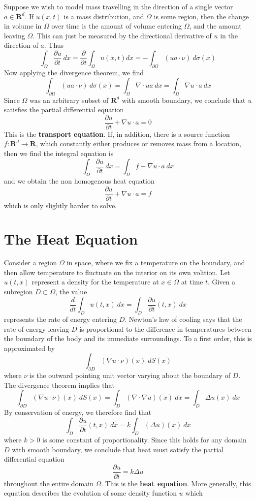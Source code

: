 Suppose we wish to model mass travelling in the direction of a single vector $a \in \mathbf{R}^d$. If $u(x,t)$ is a mass distribution, and $\Omega$ is some region, then the change in volume in $\Omega$ over time is the amount of volume entering $\Omega$, and the amount leaving $\Omega$. This can just be measured by the directional derivative of $u$ in the direction of $a$. Thus
%
\[ \int_\Omega \frac{\partial u}{\partial t}\ dx = \frac{\partial}{\partial t} \int_\Omega u(x,t) dx = - \int_{\partial \Omega} (ua \cdot \nu)\ d\sigma(x) \]
%
Now applying the divergence theorem, we find
%
\[ \int_{\partial \Omega} (ua \cdot \nu)\ d\sigma(x) = \int_\Omega \nabla \cdot ua\  dx = \int_\Omega \nabla u \cdot a\ dx \]
%
Since $\Omega$ was an arbitrary subset of $\mathbf{R}^d$ with smooth boundary, we conclude that $u$ satisfies the partial differential equation
%
\[ \frac{\partial u}{\partial t} + \nabla u \cdot a = 0 \]
%
This is the {\bf transport equation}. If, in addition, there is a source function $f: \mathbf{R}^d \to \mathbf{R}$, which constantly either produces or removes mass from a location, then we find the integral equation is
%
\[ \int_\Omega \frac{\partial u}{\partial t}\ dx = \int_\Omega f - \nabla u \cdot a\ dx \]
%
and we obtain the non homogenous heat equation
%
\[ \frac{\partial u}{\partial t} + \nabla u \cdot a = f \]
%
which is only slightly harder to solve.

\section{The Heat Equation}

Consider a region $\Omega$ in space, where we fix a temperature on the boundary, and then allow temperature to fluctuate on the interior on its own volition. Let $u(t,x)$ represent a density for the temperature at $x \in \Omega$ at time $t$. Given a subregion $D \subset \Omega$, the value
%
\[ \frac{d}{dt} \int_D u(t,x)\ dx = \int_D \frac{\partial u}{\partial t}(t,x)\ dx \]
%
represents the rate of energy entering $D$. Newton's law of cooling says that the rate of energy leaving $D$ is proportional to the difference in temperatures between the boundary of the body and its immediate surroundings. To a first order, this is approximated by
%
\[ \int_{\partial D} (\nabla u \cdot \nu)(x)\; dS(x) \]
%
where $\nu$ is the outward pointing unit vector varying about the boundary of $D$. The divergence theorem implies that
%
\[ \int_{\partial D} (\nabla u \cdot \nu)(x)\ dS(x) = \int_D (\nabla \cdot \nabla u)(x)\ dx = \int_D \Delta u(x)\ dx \]
%
By conservation of energy, we therefore find that
%
\[ \int_D \frac{\partial u}{\partial t}(t,x)\ dx = k \int_D (\Delta u)(x)\ dx \]
%
where $k > 0$ is some constant of proportionality. Since this holds for any domain $D$ with smooth boundary, we conclude that heat must satisfy the partial differential equation
%
\[ \frac{\partial u}{\partial t} = k \Delta u \]
%
throughout the entire domain $\Omega$. This is the {\bf heat equation}. More generally, this equation describes the evolution of some density function $u$ which

